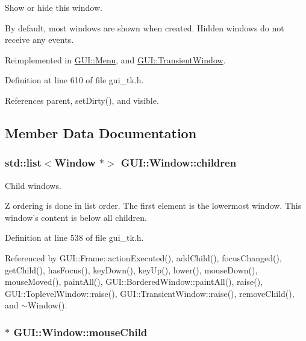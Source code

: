 Show or hide this window. 

By default, most windows are shown when created. Hidden windows do not receive any events. 

Reimplemented in \hyperlink{classGUI_1_1Menu_aa98bb7305b74088dd875ead6747cfa52}{G\-U\-I\-::\-Menu}, and \hyperlink{classGUI_1_1TransientWindow_a5581ee490ae2ce490ca45e234f6712a2}{G\-U\-I\-::\-Transient\-Window}.



Definition at line 610 of file gui\-\_\-tk.\-h.



References parent, set\-Dirty(), and visible.



\subsection{Member Data Documentation}
\hypertarget{classGUI_1_1Window_ac10e617306be4367ed164ea97f5d3132}{
\subsubsection[{children}]{\setlength{\rightskip}{0pt plus 5cm}std\-::list$<${\bf Window} $\ast$$>$ {\bf G\-U\-I\-::\-Window\-::children}}}\label{classGUI_1_1Window_ac10e617306be4367ed164ea97f5d3132}


Child windows. 

Z ordering is done in list order. The first element is the lowermost window. This window's content is below all children. 

Definition at line 538 of file gui\-\_\-tk.\-h.



Referenced by G\-U\-I\-::\-Frame\-::action\-Executed(), add\-Child(), focus\-Changed(), get\-Child(), has\-Focus(), key\-Down(), key\-Up(), lower(), mouse\-Down(), mouse\-Moved(), paint\-All(), G\-U\-I\-::\-Bordered\-Window\-::paint\-All(), raise(), G\-U\-I\-::\-Toplevel\-Window\-::raise(), G\-U\-I\-::\-Transient\-Window\-::raise(), remove\-Child(), and $\sim$\-Window().

\hypertarget{classGUI_1_1Window_addd401dab430594e678366e7ff73ef2d}{
\subsubsection[{mouse\-Child}]{$\ast$ {\bf G\-U\-I\-::\-Window\-::mouse\-Child}}}\label{classGUI_1_1Window_addd401dab430594e678366e7ff73ef2d}


